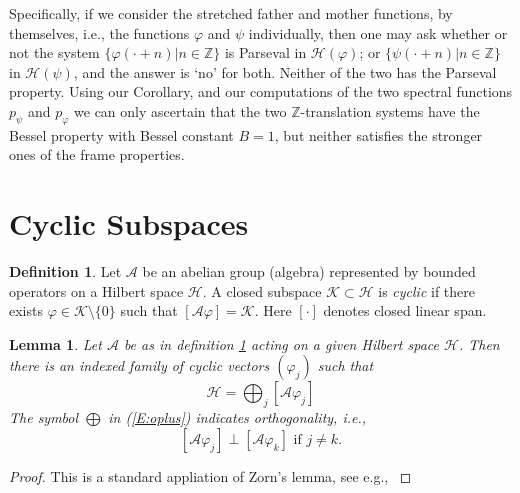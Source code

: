 \documentclass{birkmult}
\newtheorem{lem}[thm]{Lemma}
\theoremstyle{definition}
\newtheorem{defn}[thm]{Definition}
\theoremstyle{remark}
\numberwithin{equation}{section}
\begin{document}
Specifically, if we consider the stretched father and mother functions, by 
themselves, i.e., the functions $\varphi$ and $\psi$  individually, then 
one may ask whether or not the system $\{\varphi(\cdot + n) | n \in \mathbb{Z}\}$ 
is Parseval in $\mathcal{H}(\varphi)$; or 
$\{\psi(\cdot + n) | n \in \mathbb{Z}\}$ in $\mathcal{H}(\psi)$, and the 
answer is `no' for both. Neither of the two has the Parseval property. Using 
our Corollary, and our computations of the two spectral functions $p_{\psi}$ 
and $p_{\varphi}$ we can only ascertain that the two $\mathbb{Z}$-translation 
systems have the Bessel property with Bessel constant $B = 1$, but neither 
satisfies the stronger ones of the frame properties.

\section{Cyclic Subspaces}
\label{sec:5b}
\begin{defn}
\label{D:closed}
Let $\mathcal{A}$ be an abelian group (algebra) represented by bounded 
operators on a Hilbert space $\mathcal{H}$.  A closed subspace 
$\mathcal{K} \subset \mathcal{H}$ is \textit{cyclic} if there exists 
$\varphi \in \mathcal{K} \setminus \{0\}$ such that 
$[\mathcal{A}\varphi]=\mathcal{K}$.  Here $[\cdot]$ denotes closed linear 
span.
\end{defn}

\begin{lem}
\label{L:4.8b}
Let $\mathcal{A}$ be as in definition \ref{D:closed} acting on a given 
Hilbert space $\mathcal{H}$.  Then there is an indexed family of cyclic 
vectors $(\varphi_{j})$ such that 
\begin{equation}
\label{E:oplus}
  \mathcal{H} = \bigoplus_{j} [\mathcal{A}\varphi_{j}]
\end{equation}
The symbol $\bigoplus$ in (\ref{E:oplus}) indicates orthogonality, i.e.,
\[
  [\mathcal{A}\varphi_{j}] \perp [\mathcal{A}\varphi_{k}] \text{ if } j \neq k.
\]
\end{lem}
\begin{proof}
This is a standard appliation of Zorn's lemma, see e.g., \cite{Nel69}
\end{proof}
\end{document}
